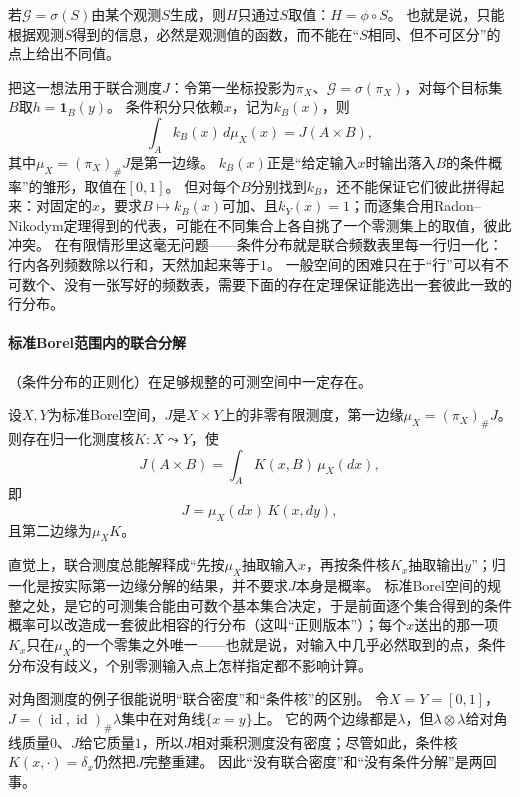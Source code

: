 若$\mathcal G=\sigma(S)$由某个观测$S$生成，则$H$只通过$S$取值：$H=\phi\circ S$。
也就是说，只能根据观测$S$得到的信息，必然是观测值的函数，而不能在“$S$相同、但不可区分”的点上给出不同值。

把这一想法用于联合测度$J$：令第一坐标投影为$\pi_X$、$\mathcal G=\sigma(\pi_X)$，对每个目标集$B$取$h=\mathbf 1_B(y)$。
条件积分只依赖$x$，记为$k_B(x)$，则
\[
 \int_A k_B(x)\,d\mu_X(x)=J(A\times B),
\]
其中$\mu_X=(\pi_X)_\#J$是第一边缘。
$k_B(x)$正是“给定输入$x$时输出落入$B$的条件概率”的雏形，取值在$[0,1]$。
但对每个$B$分别找到$k_B$，还不能保证它们彼此拼得起来：对固定的$x$，要求$B\mapsto k_B(x)$可加、且$k_Y(x)=1$；而逐集合用Radon–Nikodym定理得到的代表，可能在不同集合上各自挑了一个零测集上的取值，彼此冲突。
在有限情形里这毫无问题——条件分布就是联合频数表里每一行归一化：行内各列频数除以行和，天然加起来等于$1$。
一般空间的困难只在于“行”可以有不可数个、没有一张写好的频数表，需要下面的存在定理保证能选出一套彼此一致的行分布。

\paragraph{标准Borel范围内的联合分解}

（条件分布的正则化）在足够规整的可测空间中一定存在。

\begin{theorem}[测度的核分解]
\label{thm:measure-disintegration}
设$X,Y$为标准Borel空间，$J$是$X\times Y$上的非零有限测度，第一边缘$\mu_X=(\pi_X)_\#J$。
则存在归一化测度核$K:X\leadsto Y$，使
\[
 J(A\times B)=\int_A K(x,B)\,\mu_X(dx),
\]
即
\[
 J=\mu_X(dx)\,K(x,dy),
\]
且第二边缘为$\mu_XK$。
\end{theorem}

直觉上，联合测度总能解释成“先按$\mu_X$抽取输入$x$，再按条件核$K_x$抽取输出$y$”；归一化是按实际第一边缘分解的结果，并不要求$J$本身是概率。
标准Borel空间的规整之处，是它的可测集合能由可数个基本集合决定，于是前面逐个集合得到的条件概率可以改造成一套彼此相容的行分布（这叫“正则版本”）；每个$x$送出的那一项$K_x$只在$\mu_X$的一个零集之外唯一——也就是说，对输入中几乎必然取到的点，条件分布没有歧义，个别零测输入点上怎样指定都不影响计算。

对角图测度的例子很能说明“联合密度”和“条件核”的区别。
令$X=Y=[0,1]$，$J=(\operatorname{id},\operatorname{id})_\#\lambda$集中在对角线$\{x=y\}$上。
它的两个边缘都是$\lambda$，但$\lambda\otimes\lambda$给对角线质量$0$、$J$给它质量$1$，所以$J$相对乘积测度没有密度；尽管如此，条件核$K(x,\cdot)=\delta_x$仍然把$J$完整重建。
因此“没有联合密度”和“没有条件分解”是两回事。

